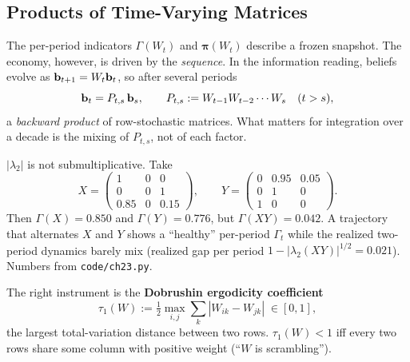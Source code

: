 \documentclass[../structural_economics_book.tex]{subfiles}
\begin{document}
\subsection{Products of Time-Varying Matrices}
\label{ch23:sec:products}

The per-period indicators $\Gamma(W_t)$ and $\boldsymbol{\pi}(W_t)$ describe a frozen snapshot. The economy, however, is driven by the \emph{sequence}. In the information reading, beliefs evolve as $\mathbf{b}_{t+1} = W_t\mathbf{b}_t$, so after several periods
\begin{equation}\label{ch23:eq:backward_product}
\mathbf{b}_t = P_{t,s}\,\mathbf{b}_s, \qquad P_{t,s} := W_{t-1}W_{t-2}\cdots W_s \quad (t > s),
\end{equation}
a \emph{backward product} of row-stochastic matrices. What matters for integration over a decade is the mixing of $P_{t,s}$, not of each factor.

\begin{remark}\label{ch23:rem:product_counterexample}
$|\lambda_2|$ is not submultiplicative. Take
\[
X = \begin{pmatrix} 1 & 0 & 0\\ 0 & 0 & 1\\ 0.85 & 0 & 0.15 \end{pmatrix}, \qquad
Y = \begin{pmatrix} 0 & 0.95 & 0.05\\ 0 & 1 & 0\\ 1 & 0 & 0 \end{pmatrix}.
\]
Then $\Gamma(X) = 0.850$ and $\Gamma(Y) = 0.776$, but $\Gamma(XY) = 0.042$. A trajectory that alternates $X$ and $Y$ shows a ``healthy'' per-period $\Gamma_t$ while the realized two-period dynamics barely mix (realized gap per period $1 - |\lambda_2(XY)|^{1/2} = 0.021$). Numbers from \texttt{code/ch23.py}.
\end{remark}

The right instrument is the \textbf{Dobrushin ergodicity coefficient}
\begin{equation}\label{ch23:eq:dobrushin}
\tau_1(W) := \tfrac{1}{2}\max_{i,j}\sum_k |W_{ik} - W_{jk}| \;\in [0,1],
\end{equation}
the largest total-variation distance between two rows. $\tau_1(W) < 1$ iff every two rows share some column with positive weight (``$W$ is scrambling'').
\end{document}
